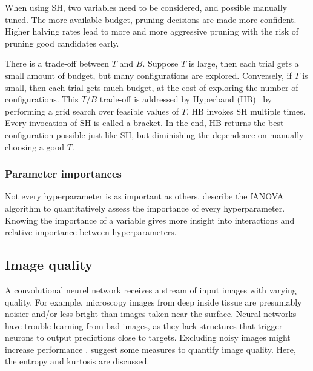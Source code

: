 When using SH, two variables need to be considered, and possible manually tuned.
The more available budget, pruning decisions are made more confident.
Higher halving rates lead to more and more aggressive pruning with the risk of pruning good candidates early.

There is a trade-off between $T$ and $B$.
Suppose $T$ is large, then each trial gets a small amount of budget, but many configurations are explored.
Conversely, if $T$ is small, then each trial gets much budget, at the cost of exploring the number of configurations.
This $T/B$ trade-off is addressed by Hyperband (HB)~\cite{Li2016} by performing a grid search over feasible values of $T$.
HB invokes SH multiple times.
Every invocation of SH is called a bracket.
In the end, HB returns the best configuration possible just like SH, but diminishing the dependence on manually choosing a good $T$.

\subsubsection{Parameter importances}
Not every hyperparameter is as important as others.
\textcite{Hutter2014} describe the fANOVA algorithm to quantitatively assess the importance of every hyperparameter.
Knowing the importance of a variable gives more insight into interactions and relative importance between hyperparameters.



\subsection{Image quality}\label{subsec:imq}
A convolutional neurel network receives a stream of input images with varying quality.
For example, microscopy images from deep inside tissue are presumably noisier and/or less bright than images taken near the surface.
Neural networks have trouble learning from bad images, as they lack structures that trigger neurons to output predictions close to targets.
Excluding noisy images might increase performance \cite{Blokker2022}.
\textcite{Koho2016} suggest some measures to quantify image quality.
Here, the entropy and kurtosis are discussed.

